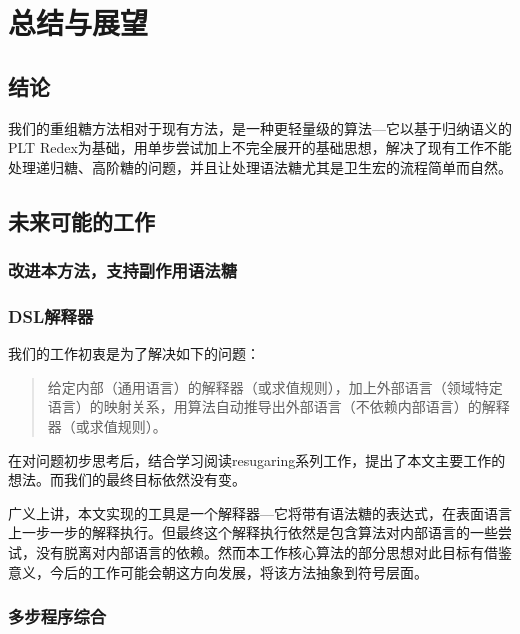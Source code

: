 \pagestyle{fancy}
\normalsize
\linespread{1.5}\selectfont
\label{mark:chapter6}\chapter{总结与展望}
\section{结论}
我们的重组糖方法相对于现有方法，是一种更轻量级的算法---它以基于归纳语义的PLT Redex为基础，用单步尝试加上不完全展开的基础思想，解决了现有工作不能处理递归糖、高阶糖的问题，并且让处理语法糖尤其是卫生宏的流程简单而自然。

\section{未来可能的工作}

\subsection{改进本方法，支持副作用语法糖}

\subsection{DSL解释器}
我们的工作初衷是为了解决如下的问题：

\begin{quote}
	给定内部（通用语言）的解释器（或求值规则），加上外部语言（领域特定语言）的映射关系，用算法自动推导出外部语言（不依赖内部语言）的解释器（或求值规则）。
\end{quote}

在对问题初步思考后，结合学习阅读resugaring系列工作，提出了本文主要工作的想法。而我们的最终目标依然没有变。

广义上讲，本文实现的工具是一个解释器---它将带有语法糖的表达式，在表面语言上一步一步的解释执行。但最终这个解释执行依然是包含算法对内部语言的一些尝试，没有脱离对内部语言的依赖。然而本工作核心算法的部分思想对此目标有借鉴意义，今后的工作可能会朝这方向发展，将该方法抽象到符号层面。

\subsection{多步程序综合}

